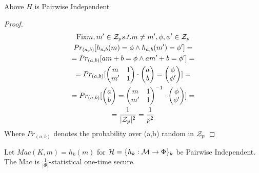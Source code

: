 \begin{theorem}
    Above $H$ is Pairwise Independent
\end{theorem}
\begin{proof}
    \begin{gather*}
        \text{Fix} m,m' \in \mathcal{Z}_p s.t. m\neq m', \phi,\phi' \in \mathcal{Z}_p\\
        Pr_{(a,b)}[h_{a,b}(m)=\phi \wedge h_{a,b}(m')=\phi']=\\
        =Pr_{(a,b)}[am+b=\phi \wedge am'+b=\phi']=\\
        =Pr_{(a,b)}[
        \begin{pmatrix}
            m & 1 \\
            m' & 1
        \end{pmatrix}
        \cdot
        \begin{pmatrix}
            a \\
            b
        \end{pmatrix}
        =
        \begin{pmatrix}
            \phi \\
            \phi'
        \end{pmatrix}
        ]=\\
        =Pr_{(a,b)}[
        \begin{pmatrix}
            a \\
            b
        \end{pmatrix}
        =
        \begin{pmatrix}
            m & 1 \\
            m' & 1
        \end{pmatrix}^{-1}
        \cdot
        \begin{pmatrix}
            \phi \\
            \phi'
        \end{pmatrix}
        ]=\\
        =\frac{1}{|\mathcal{Z}_p|^2}=\frac{1}{p^2}
    \end{gather*}
    Where $Pr_{(a,b)}$ denotes the probability over (a,b) random in $\mathcal{Z}_p$
\end{proof}

\begin{theorem}
    Let $Mac(K,m)=h_k(m)$ for $\mathcal{H}=\{h_k:\mathcal{M} \to \Phi \}_k$ be Pairwise Independent. The Mac is $\frac{1}{|\Phi|}$-statistical one-time secure. 
\end{theorem}

